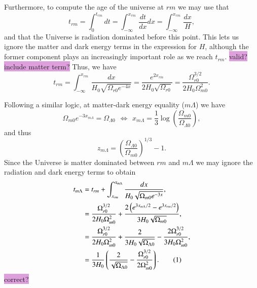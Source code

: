 \documentclass{aa}
\newcommand\numberthis{\addtocounter{equation}{1}\tag{\theequation}}
\begin{document}
Furthermore, to compute the age of the universe at $rm$ we may use that
\begin{equation}
  t_{rm} = \int^{t_{rm}}_{0}dt = \int^{x_{rm}}_{-\infty}\frac{dt}{dx}dx = \int^{x_{rm}}_{-\infty}\frac{dx}{H},
\end{equation}
and that the Universe is radiation dominated before this point. This lets us ignore the matter and dark energy terms in the expression for $H$, although the former component plays an increasingly important role as we reach $t_{rm}$. \colorbox{Plum}{valid? include matter term?} Thus, we have
\begin{equation}
  t_{rm} = \int^{x_{rm}}_{-\infty}\frac{dx}{H_0\sqrt{\Omega_{r0}e^{-4x}}} = \frac{e^{2x_{rm}}}{2H_0\sqrt{\Omega_{r0}}} = \frac{\Omega_{r0}^{3/2}}{2H_0\Omega_{m0}^2}.
\end{equation}

Following a similar logic, at matter-dark energy equality ($m\Lambda$) we have
\begin{equation}
  \Omega_{m0}e^{-3x_{m\Lambda}} = \Omega_{\Lambda0}
  \hspace{5pt}\Leftrightarrow\hspace{5pt}
  x_{m\Lambda} = \frac{1}{3}\log\left(\frac{\Omega_{m0}}{\Omega_{\Lambda0}}\right),
\end{equation}
and thus
\begin{equation}
  z_{m\Lambda} = \left(\frac{\Omega_{\Lambda0}}{\Omega_{m0}}\right)^{1/3} - 1.
\end{equation}
Since the Universe is matter dominated between $rm$ and $m\Lambda$ we may ignore the radiation and dark energy terms to obtain
\begin{align*}
  t_{m\Lambda} &= t_{rm} + \int^{x_{m\Lambda}}_{x_{rm}}\frac{dx}{H_0\sqrt{\Omega_{m0}e^{-3x}}}, 
  \\
  &= \frac{\Omega_{r0}^{3/2}}{2H_0\Omega_{m0}^2} +\frac{2\left(e^{3x_{m\Lambda}/2} - e^{3x_{rm}/2} \right)}{3H_0\sqrt{\Omega_{m0}}}, 
  \\
  &= \frac{\Omega_{r0}^{3/2}}{2H_0\Omega_{m0}^2} + \frac{2}{3H_0\sqrt{\Omega_{\Lambda0}}} - \frac{2\Omega_{r0}^{3/2}}{3H_0\Omega_{m0}^2},
  \\
  &= \frac{1}{3H_0}\left(\frac{2}{\sqrt{\Omega_{\Lambda0}}} -\frac{\Omega_{r0}^{3/2}}{2\Omega_{m0}^2}\right). \numberthis
\end{align*}
\colorbox{Plum}{correct?}
\end{document}
